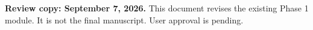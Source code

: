 \documentclass[11pt]{article}
\begin{document}
\noindent\textbf{Review copy: September 7, 2026.} This document revises the
existing Phase 1 module. It is not the final manuscript. User approval is pending.

\end{document}
